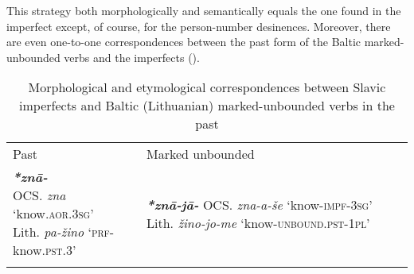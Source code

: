 \documentclass[output=paper]{langsci/langscibook}
\begin{document}
This strategy both morphologically and semantically equals the one found in the  imperfect except, of course, for the person-number desinences. Moreover, there are even one-to-one correspondences between the past form of the Baltic marked-unbounded verbs and the  imperfects \citep{Ostrowski2006} ().



\begin{table}[h]
\caption{Morphological and etymological correspondences between Slavic imperfects and Baltic (Lithuanian) marked-unbounded verbs in the past \citep{Ostrowski2006}}
\label{tab:wiemerserzant:7}
\begin{tabularx}{\textwidth}{QQ}
\lsptoprule
 Past  & Marked unbounded\\
\midrule 
{ \textbf{\textit{*znā-}}\newline
OCS. \textit{zna} ‘know.\textsc{aor.3sg’} \newline
Lith. \textit{pa-žino}{\footnotemark} ‘\textsc{prf-}know.\textsc{pst.3}’} &
 \textbf{\textit{*znā-jā-}}\newline
OCS. \textit{zna-a-še} ‘know-\textsc{impf-3sg’}\newline
Lith. \textit{žino-jo-me} ‘know-\textsc{unbound.pst-1pl’}\\
\lspbottomrule
\end{tabularx}
\end{table}
\end{document}
